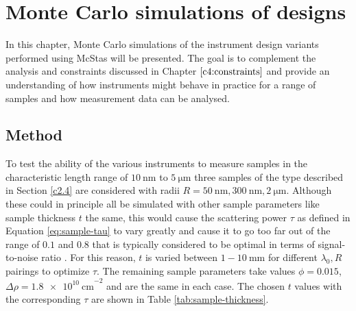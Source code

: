 \chapter{Monte Carlo simulations of designs}
\label{chapter:optimization}
\label{c6:monte-carlo}
In this chapter, Monte Carlo simulations of the instrument design variants performed using McStas \cite{willendrup2020} will be presented. The goal is to complement the analysis and constraints discussed in Chapter $\ref{c4:constraints}$ and provide an understanding of how instruments might behave in practice for a range of samples and how measurement data can be analysed. 


\section{Method}
To test the ability of the various instruments to measure samples in the characteristic length range of $\SI{10}{\nano\meter}$ to $\SI{5}{\micro\meter}$ three samples of the type described in Section \ref{c2.4} are considered with radii $R = \SI{50}{\nano\meter}, \SI{300}{\nano\meter}, \SI{2}{\micro\meter}$. Although these could in principle all be simulated with other sample parameters like sample thickness $t$ the same, this would cause the scattering power $\tau$ as defined in Equation \eqref{eq:sample-tau} to vary greatly and cause it to go too far out of the range of $0.1$ and $0.8$ that is typically considered to be optimal in terms of signal-to-noise ratio \cite{bouwman2021b}\cite{heijkamp2011}. For this reason, $t$ is varied between $1 - 10 ~\unit{\milli\meter}$ for different $\lambda_0, R$ pairings to optimize $\tau$. The remaining sample parameters take values $\phi = 0.015$, $\Delta\rho = \SI{1.8e10}{\centi\meter}^{-2}$ and are the same in each case. The chosen $t$ values with the corresponding $\tau$ are shown in Table \ref{tab:sample-thickness}.

